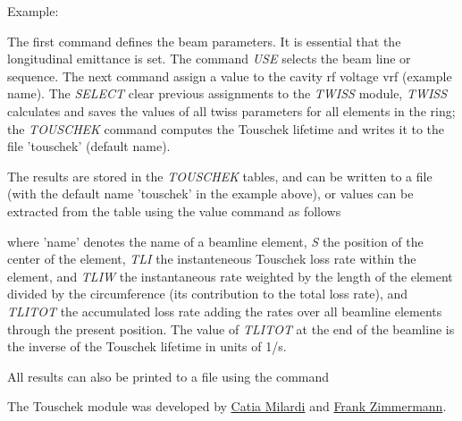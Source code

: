 Example: 

The first command defines the beam parameters. It is essential that the
longitudinal emittance is set. The command
\textit{USE} selects the beam line or sequence. The next command assign
a value to the cavity rf voltage vrf  (example name). The
\textit{SELECT} clear previous assignments to the \textit{TWISS} module,
\textit{TWISS} calculates and saves the values of all twiss parameters
for all elements in the ring; the \textit{TOUSCHEK} command computes the
Touschek lifetime and writes it to the file 'touschek' (default name).   

The results are stored in the \textit{TOUSCHEK} tables, and can be written to a 
file (with the default name 'touschek' in the example above), or values can be 
extracted from the table using the value command as follows 

where 'name' denotes the name of a beamline element, \textit{S} the
position of the center of the element, \textit{TLI} the instanteneous
Touschek loss rate within the element, and \textit{TLIW} the
instantaneous rate weighted by the length of the element divided by the
circumference (its contribution to the total loss rate), and
\textit{TLITOT} the accumulated loss rate adding the rates over all beamline
elements through the present position. The value of \textit{TLITOT} at
the end of the beamline is the inverse of the Touschek lifetime in units
of 1/s. 

All results can also be printed to a file using the command 

The \madx Touschek module was developed by
\href{mailto:catia.milardi@lnf.infn.it}{Catia Milardi} and 
\href{mailto:frank.zimmermann@cern.ch}{Frank Zimmermann}.

